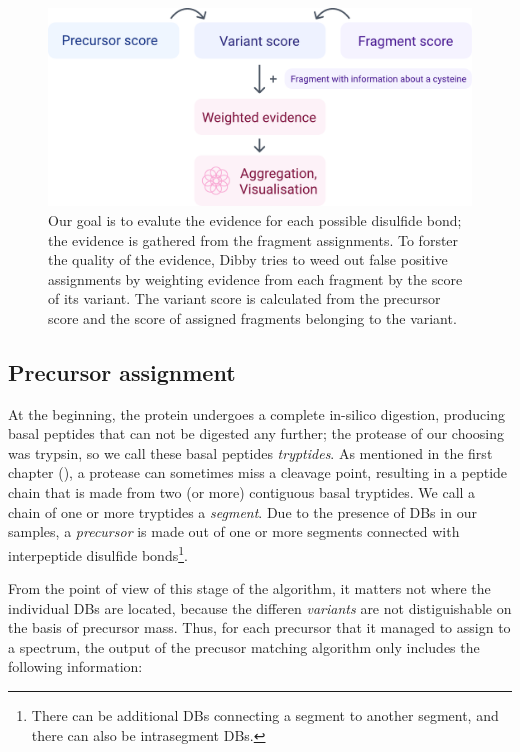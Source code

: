 \begin{figure}
  \centering
  \includegraphics[width=0.75\linewidth]{img/score-calculation.pdf}
  \caption{Our goal is to evalute the evidence for each possible disulfide bond; the evidence is gathered from the fragment assignments. To forster the quality of the evidence, Dibby tries to weed out false positive assignments by weighting evidence from each fragment by the score of its variant. The variant score is calculated from the precursor score and the score of assigned fragments belonging to the variant.}\label{fig:score-calculation}
\end{figure}


\subsection{Precursor assignment}

At the beginning, the protein undergoes a complete in-silico digestion, producing basal peptides that can not be digested any further; the protease of our choosing was trypsin, so we call these basal peptides \emph{tryptides}. As mentioned in the first chapter (), a protease can sometimes miss a cleavage point, resulting in a peptide chain that is made from two (or more) contiguous basal tryptides. We call a chain of one or more tryptides a \emph{segment}. Due to the presence of DBs in our samples, a \emph{precursor} is made out of one or more segments connected with interpeptide disulfide bonds\footnote{There can be additional DBs connecting a segment to another segment, and there can also be intrasegment DBs.}.


From the point of view of this stage of the algorithm, it matters not where the individual DBs are located, because the differen \emph{variants} are not distiguishable on the basis of precursor mass. Thus, for each precursor that it managed to assign to a spectrum, the output of the precusor matching algorithm only includes the following information:

